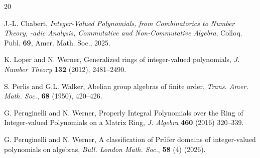 \documentclass{amsart}
\makeatletter
\newtheorem{first argument}[lemma]{First Argument}
\theoremstyle{definition}
\theoremstyle{definitions}
\theoremstyle{remark}
\theoremstyle{remark}
\newcounter{mathrecordid}
\newcommand{\mathboxbegin}[1]{%
  \stepcounter{mathrecordid}%
  \immediate\write\mathrecords{\themathrecordid,#1}%
  \special{pdf:bann << /Type /Annot /Subtype /Link /Border [0 0 0]
    /MathBoxID \themathrecordid /F 2
    /A << /S /URI /URI (urn:mathbox:\themathrecordid) >> >>}}
\newcommand{\mathboxinlineplain}[1]{$#1$}
\newcommand{\mathboxinline}[1]{%
  $\mathboxbegin{inline}%
  \special{pdf:literal direct /MathBoxBegin\themathrecordid\space MP}%
  #1\special{pdf:literal direct /MathBoxEnd\themathrecordid\space MP}%
  \special{pdf:eann}$}
\newcommand{\recordmath}{%
  \ifmeasuring@\expandafter\mathboxinlineplain
  \else\expandafter\mathboxinline\fi}
\makeatother
\begin{document}
\begin{thebibliography}{20}



J.-L. Chabert, {\em Integer-Valued Polynomials, from Combinatorics to Number Theory, \recordmath{p}-adic Analysis, Commutative and Non-Commutative Algebra}, Colloq. Publ. {\bf 69}, Amer. Math. Soc., 2025.

K. Loper and N. Werner, Generalized rings of integer-valued polynomials, {\em J. Number Theory} {\bf 132} (2012), 2481--2490.

S. Perlis and G.L. Walker, Abelian group algebras of finite order, {\em Trans. Amer. Math. Soc.}, {\bf 68} (1950), 420--426.


G. Peruginelli and N. Werner, Properly Integral Polynomials over the Ring of Integer-valued Polynomials on a Matrix Ring, {\em J. Algebra} {\bf 460} (2016) 320--339.

G. Peruginelli and N. Werner, A classification of Pr\"ufer domains of integer-valued polynomials on algebras, {\em Bull. London Math. Soc.}, {\bf 58} (4) (2026).
\end{thebibliography}
\end{document}

